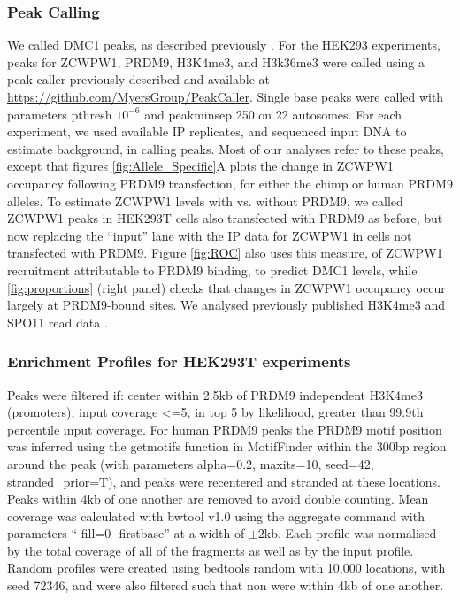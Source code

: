 \subsubsection{Peak Calling}
We called DMC1 peaks, as described previously \parencite{Davies2016Reengineering}. For the HEK293 experiments, peaks for ZCWPW1, PRDM9, H3K4me3, and H3k36me3 were called using a peak caller previously described \parencite{Davies2016Reengineering} and available at \url{https://github.com/MyersGroup/PeakCaller}. Single base peaks were called with parameters pthresh $10^{-6}$ and peakminsep 250 on 22 autosomes. For each experiment, we used available IP replicates, and sequenced input DNA to estimate background, in calling peaks. Most of our analyses refer to these peaks, except that figures \ref{fig:Allele_Specific}A plots the change in ZCWPW1 occupancy following PRDM9 transfection, for either the chimp or human PRDM9 alleles. To estimate ZCWPW1 levels with vs. without PRDM9, we called ZCWPW1 peaks in HEK293T cells also transfected with PRDM9 as before, but now replacing the ``input'' lane with the IP data for ZCWPW1 in cells not transfected with PRDM9. Figure \ref{fig:ROC} also uses this measure, of ZCWPW1 recruitment attributable to PRDM9 binding, to predict DMC1 levels, while \ref{fig:proportions} (right panel) checks that changes in ZCWPW1 occupancy occur largely at PRDM9-bound sites. We analysed previously published H3K4me3 and SPO11 read data \parencite{Davies2016Reengineering, Lange2016Landscape}.

\subsubsection{Enrichment Profiles for HEK293T experiments}
Peaks were filtered if: center within 2.5kb of PRDM9 independent H3K4me3 (promoters), input coverage <=5, in top 5 by likelihood, greater than 99.9th percentile input coverage. For human PRDM9 peaks the PRDM9 motif position \parencite{Altemose2017map} was inferred using the getmotifs function in MotifFinder within the 300bp region around the peak (with parameters alpha=0.2, maxits=10, seed=42, stranded\_prior=T), and peaks were recentered and stranded at these locations. Peaks within 4kb of one another are removed to avoid double counting. Mean coverage was calculated with bwtool v1.0 using the aggregate command with parameters “-fill=0 -firstbase” at a width of $\pm2$kb. Each profile was normalised by the total coverage of all of the fragments as well as by the input profile. Random profiles were created using bedtools random with 10,000 locations, with seed 72346, and were also filtered such that non were within 4kb of one another.

